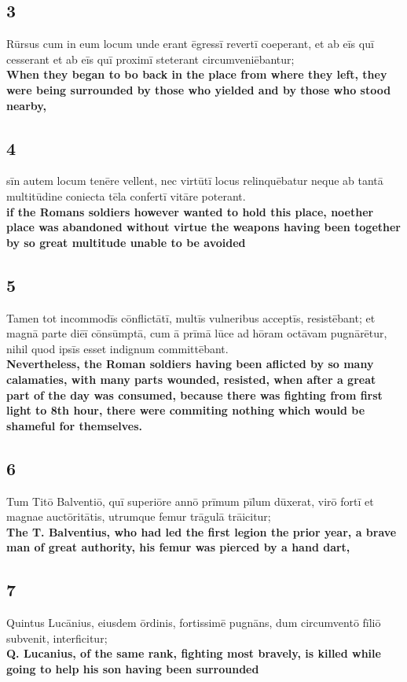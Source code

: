 \documentclass{article}
\begin{document}
\subsection*{3}
Rūrsus cum in eum locum unde erant ēgressī revertī coeperant, et ab eīs quī cesserant et ab eīs quī proximī steterant circumveniēbantur; \\
\textbf{When they began to bo back in the place from where they left, they were being surrounded by those who yielded and by those who stood nearby,}

\subsection*{4}
sīn autem locum tenēre vellent, nec virtūtī locus relinquēbatur neque ab tantā multitūdine coniecta tēla confertī vitāre poterant. \\
\textbf{if the Romans soldiers however wanted to hold this place, noether place was abandoned without virtue the weapons having been together by so great multitude unable to be avoided}

\subsection*{5}
Tamen tot incommodīs cōnflictātī, multīs vulneribus acceptīs, resistēbant; et magnā parte diēī cōnsūmptā, cum ā prīmā lūce ad hōram octāvam pugnārētur, nihil quod ipsīs esset indignum committēbant.\\
\textbf{Nevertheless, the Roman soldiers having been aflicted by so many calamaties, with many parts wounded, resisted, when after a great part of the day was consumed, because there was fighting from first light to 8th hour, there were commiting nothing which would be shameful for themselves. }

\subsection*{6}
Tum Titō Balventiō, quī superiōre annō prīmum pīlum dūxerat, virō fortī et magnae auctōritātis, utrumque femur trāgulā trāicitur; \\
\textbf{The T. Balventius, who had led the first legion the prior year, a brave man of great authority, his femur was pierced by a hand dart,}

\subsection*{7}
Quintus Lucānius, eiusdem ōrdinis, fortissimē pugnāns, dum circumventō fīliō subvenit, interficitur; \\
\textbf{Q. Lucanius, of the same rank, fighting most bravely, is killed while going to help his son having been surrounded}
\end{document}
